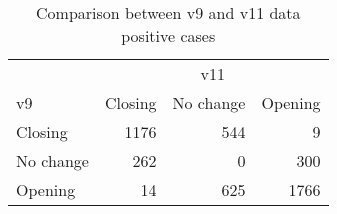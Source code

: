 \begin{table}

\caption{\label{tab:v9-v11-comp}Comparison between v9 and v11 data positive cases}
\centering
\begin{tabular}[t]{lrrr}
\toprule
\multicolumn{1}{c}{ } & \multicolumn{3}{c}{v11} \\
\cmidrule(l{3pt}r{3pt}){2-4}
v9 & Closing & No change & Opening\\
\midrule
Closing & 1176 & 544 & 9\\
No change & 262 & 0 & 300\\
Opening & 14 & 625 & 1766\\
\bottomrule
\end{tabular}
\end{table}
